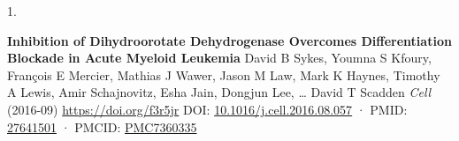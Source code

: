 \documentclass[
]{article}
\newlength{\cslhangindent}
\newlength{\csllabelwidth}
\newlength{\cslentryspacingunit} %
\newenvironment{CSLReferences}[2] %
 {%
  \setlength{\parindent}{0pt}
  \ifodd #1
  \let\oldpar\par
  \def\par{\hangindent=\cslhangindent\oldpar}
  \fi
  \setlength{\parskip}{#2\cslentryspacingunit}
 }%
 {}
\newcommand{\CSLBlock}[1]{#1\hfill\break}
\newcommand{\CSLLeftMargin}[1]{\parbox[t]{\csllabelwidth}{#1}}
\newcommand{\CSLRightInline}[1]{\parbox[t]{\linewidth - \csllabelwidth}{#1}\break}
\begin{document}
\hypertarget{refs}{}
\begin{CSLReferences}{0}{0}
\leavevmode{}%
\CSLLeftMargin{1. }
\CSLRightInline{\textbf{Inhibition of Dihydroorotate Dehydrogenase Overcomes Differentiation Blockade in Acute Myeloid Leukemia}
\CSLBlock{David B Sykes, Youmna S Kfoury, François E Mercier, Mathias J Wawer, Jason M Law, Mark K Haynes, Timothy A Lewis, Amir Schajnovitz, Esha Jain, Dongjun Lee, \ldots{} David T Scadden} \emph{Cell} (2016-09) \url{https://doi.org/f3r5jr}
\CSLBlock{DOI: \href{https://doi.org/10.1016/j.cell.2016.08.057}{10.1016/j.cell.2016.08.057} · PMID: \href{https://www.ncbi.nlm.nih.gov/pubmed/27641501}{27641501} · PMCID: \href{https://www.ncbi.nlm.nih.gov/pmc/articles/PMC7360335}{PMC7360335}}}

\end{CSLReferences}
\end{document}
